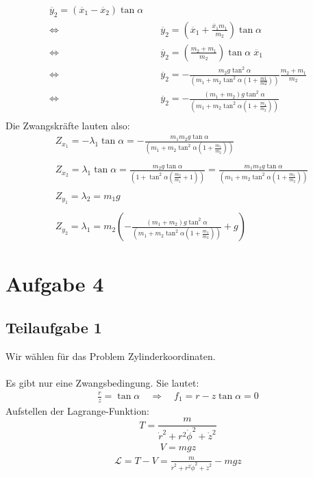 \documentclass[a4paper,german,12pt,smallheadings]{scrartcl}
\begin{document}
\begin{align*}
\ddot{y_2}=\left(\ddot{x_1}-\ddot{x_2}\right) \tan \alpha\\
\Leftrightarrow & \quad \ddot{y_2}=\left(\ddot{x_1}+\frac{\ddot{x_1}m_1}{m_2}\right) \tan \alpha\\
\Leftrightarrow & \quad \ddot{y_2}=\left(\frac{m_2+m_1}{m_2}\right) \tan \alpha \; \ddot{x_1}\\
\Leftrightarrow & \quad \ddot{y_2}=-\frac{m_2g\tan^2 \alpha}{\left(m_1+m_2\tan^2 \alpha \left(1+\frac{m1}{m2}\right)\right)} \frac{m_2+m_1}{m_2}\\
\Leftrightarrow & \quad \ddot{y_2}=-\frac{\left(m_1+m_2\right)g\tan^2 \alpha}{\left(m_1+m_2\tan^2 \alpha \left(1+\frac{m_1}{m_2}\right)\right)}\\
\end{align*}
Die Zwangskräfte lauten also:
\begin{align*}
& Z_{x_1}=-\lambda_1 \tan \alpha=-\frac{m_1 m_2 g \tan \alpha}{\left(m_1+m_2 \tan^2 \alpha \left(1+\frac{m_1}{m_2}\right)\right)}\\
\\
& Z_{x_2}=\lambda_1 \tan \alpha=\frac{m_2 g \tan \alpha}{\left(1+\tan^2 \alpha \left(\frac{m_2}{m_1}+1\right) \right)}=\frac{m_1 m_2 g \tan \alpha}{\left(m_1+m_2 \tan^2 \alpha \left(1+\frac{m_1}{m_2}\right)\right)}\\
\\
& Z_{y_1}=\lambda_2=m_1g\\
\\
& Z_{y_2}=\lambda_1=m_2\left(-\frac{\left(m_1+m_2\right)g\tan^2 \alpha}{\left(m_1+m_2\tan^2 \alpha \left(1+\frac{m_1}{m_2}\right)\right)}+g\right)
\end{align*}

\section*{Aufgabe 4}
\subsection*{Teilaufgabe 1}
Wir wählen für das Problem Zylinderkoordinaten.\\
\\
Es gibt nur eine Zwangsbedingung. Sie lautet:
\begin{align*}
\frac{r}{z}=\tan \alpha \quad \Rightarrow \quad f_1=r-z \tan \alpha =0
\end{align*}
Aufstellen der Lagrange-Funktion:
\begin{equation}
T=\frac{m}{\dot{r}^2+r^2\dot{\phi}^2+\dot{z}^2}
\end{equation}
\begin{align*}
V=mgz
\end{align*}
\begin{align*}
\mathcal{L}=T-V=\frac{m}{\dot{r}^2+r^2\dot{\phi}^2+\dot{z}^2}-mgz
\end{align*}
\end{document}

